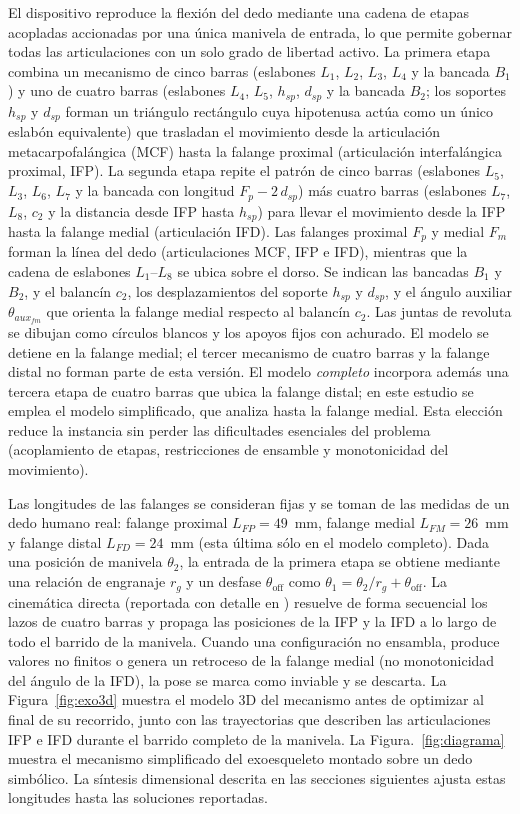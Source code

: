 \documentclass[conference]{IEEEtran}
\begin{document}
El dispositivo reproduce la flexión del dedo mediante una cadena de etapas
acopladas accionadas por una única manivela de entrada, lo que permite gobernar
todas las articulaciones con un solo grado de libertad activo. La primera etapa
combina un mecanismo de cinco barras (eslabones $L_1$, $L_2$, $L_3$, $L_4$ y la
bancada $B_1$) y uno de cuatro barras (eslabones $L_4$, $L_5$, $h_{sp}$,
$d_{sp}$ y la bancada $B_2$; los soportes $h_{sp}$ y $d_{sp}$ forman un
triángulo rectángulo cuya hipotenusa actúa como un único eslabón equivalente) que
trasladan el movimiento desde la articulación metacarpofalángica (MCF) hasta la
falange proximal (articulación interfalángica proximal, IFP). La segunda etapa
repite el patrón de cinco barras (eslabones $L_5$, $L_3$, $L_6$, $L_7$ y la
bancada con longitud $F_p - 2\,d_{sp}$) más cuatro barras (eslabones $L_7$,
$L_8$, $c_2$ y la distancia desde IFP hasta $h_{sp}$) para llevar el movimiento
desde la IFP hasta la falange medial (articulación IFD). Las falanges proximal
$F_p$ y medial $F_m$ forman la línea del dedo (articulaciones MCF, IFP e IFD),
mientras que la cadena de eslabones $L_1$--$L_8$ se ubica sobre el dorso. Se
indican las bancadas $B_1$ y $B_2$, y el balancín $c_2$, los desplazamientos del
soporte $h_{sp}$ y $d_{sp}$, y el ángulo auxiliar $\theta_{aux_{fm}}$ que orienta
la falange medial respecto al balancín $c_2$. Las juntas de revoluta se dibujan
como círculos blancos y los apoyos fijos con achurado. El modelo se detiene en la
falange medial; el tercer mecanismo de cuatro barras y la falange distal no
forman parte de esta versión. El modelo \emph{completo} incorpora además una
tercera etapa de cuatro barras que ubica la falange distal; en este estudio se
emplea el modelo simplificado, que analiza hasta la falange medial. Esta elección
reduce la instancia sin perder las dificultades esenciales del problema
(acoplamiento de etapas, restricciones de ensamble y monotonicidad del
movimiento).

Las longitudes de las falanges se consideran fijas y se toman de las medidas de
un dedo humano real: falange proximal $L_{FP}=49$~mm, falange medial
$L_{FM}=26$~mm y falange distal $L_{FD}=24$~mm (esta última sólo en el modelo
completo). Dada una posición de manivela $\theta_2$, la entrada de la primera
etapa se obtiene mediante una relación de engranaje $r_g$ y un desfase
$\theta_{\text{off}}$ como $\theta_1=\theta_2/r_g+\theta_{\text{off}}$. La
cinemática directa (reportada con detalle en \cite{ref_palma}) resuelve de forma secuencial los lazos de cuatro barras y
propaga las posiciones de la IFP y la IFD a lo largo de todo el barrido de la
manivela. Cuando una configuración no ensambla, produce valores no finitos o
genera un retroceso de la falange medial (no monotonicidad del ángulo de la IFD),
la pose se marca como inviable y se descarta. La Figura~\ref{fig:exo3d} muestra
el modelo 3D del mecanismo antes de optimizar al final de su recorrido, junto con
las trayectorias que describen las articulaciones IFP e IFD durante el barrido
completo de la manivela. La Figura.~\ref{fig:diagrama} muestra
el mecanismo simplificado del exoesqueleto montado sobre un dedo simbólico. La síntesis dimensional descrita en las secciones siguientes
ajusta estas longitudes hasta las soluciones reportadas.
\end{document}
